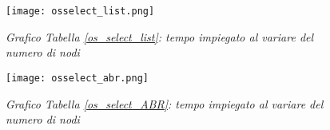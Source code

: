 \documentclass{article}
\begin{document}
\begin{figure}[H]
    \begin{minipage}{.5\linewidth}
      \centering
            \texttt{[image: osselect\_list.png]}
      \caption{\textit{Grafico Tabella \ref{os_select_list}: tempo impiegato al variare del numero di nodi}}
      \label{select_listgra}
    \end{minipage}%
    \hspace{10pt}
    \begin{minipage}{.5\linewidth}
      \centering
            \texttt{[image: osselect\_abr.png]}
        \caption{\textit{Grafico Tabella \ref{os_select_ABR}: tempo impiegato al variare del numero di nodi}}
        \label{select_abrgra}
    \end{minipage} 
\end{figure}
\newpage
\end{document}

